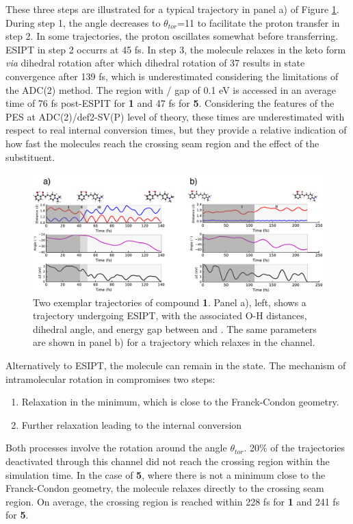 These three steps are illustrated for a typical trajectory in panel a) of Figure \ref{figure: HC_1_Trajectories}. During step 1, the angle decreases to $\theta_{tor}$=11\textdegree{} to facilitate the proton transfer in step 2. In some trajectories, the proton oscillates somewhat before transferring. ESIPT in step 2 occurrs at 45 fs. In step 3, the molecule relaxes in the keto form \textit{via} dihedral rotation after which dihedral rotation of 37\textdegree{} results in state convergence after 139 fs, which is underestimated considering the limitations of the ADC(2) method. The region with \sone/\szero{} gap of 0.1 eV is accessed in an average time of 76 fs post-ESPIT for \textbf{1} and 47 fs for \textbf{5}. Considering the features of the PES at ADC(2)/def2-SV(P) level of theory, these times are underestimated with respect to real internal conversion times, but they provide a relative indication of how fast the molecules reach the crossing seam region and the effect of the substituent.
\begin{figure}[t]
\centering
  \includegraphics[width=0.9\linewidth]{3nonradiativedecay/HC_1_Trajectories.pdf}
  \caption[Typical trajectories for \textbf{HC1}]{Two exemplar trajectories of compound \textbf{1}. Panel a), left, shows a trajectory undergoing ESIPT, with the associated O-H distances, dihedral angle, and energy gap between \sone{} and \szero{}. The same parameters are shown in panel b) for a trajectory which relaxes in the \Estar{} channel.}
  \label{figure: HC_1_Trajectories}
\end{figure}

Alternatively to ESIPT, the molecule can remain in the \Estar{} state. The mechanism of intramolecular rotation in \Estar{} compromises two steps: 
\begin{enumerate}
    \item Relaxation in the \Estar{} minimum, which is close to the Franck-Condon geometry.
    \item Further relaxation leading to the internal conversion
\end{enumerate}
Both processes involve the rotation around the angle $\theta_{tor}$. 20\% of the trajectories deactivated through this channel did not reach the crossing region within the simulation time. In the case of \textbf{5}, where there is not a \Estar{} minimum close to the Franck-Condon geometry, the molecule relaxes directly to the crossing seam region. On average, the crossing region is reached within  228 fs for \textbf{1} and 241 fs for \textbf{5}. 


